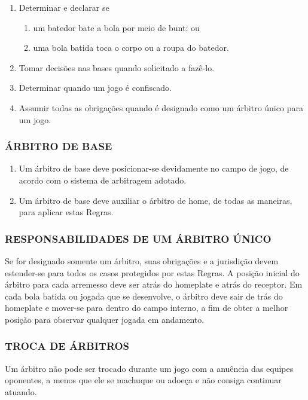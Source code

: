 \begin{multicols}{2}
\begin{enumerate}[label=\alph*)]
		\item  Determinar e declarar se 
		\begin{enumerate}[label=\roman* -]
			\item um batedor bate a bola por meio de \gls{bunt}; ou 
			\item uma bola batida toca o corpo ou a roupa do batedor. 
		\end{enumerate}
		
		\item  Tomar decis\~oes nas bases quando solicitado a faz\^e-lo. 
		
		\item  Determinar quando um jogo \'e confiscado. 
		
		\item  Assumir todas as obriga\c{c}\~oes quando \'e designado como um \'arbitro \'unico para um jogo. 
	\end{enumerate}
	
	
	\subsubsection{\'ARBITRO DE BASE} 
	
	\begin{enumerate}[label=\alph*)]
		\item Um \'arbitro de base deve posicionar-se devidamente no campo de jogo, de acordo com o sistema de arbitragem adotado. 
		
		\item  Um \'arbitro de base deve auxiliar o \'arbitro de \gls{home}, de todas as maneiras, para aplicar estas Regras. 
	\end{enumerate}
	
	\subsubsection{RESPONSABILIDADES DE UM \'ARBITRO ÚNICO }
	Se for designado somente um \'arbitro, suas obriga\c{c}\~oes e a jurisdi\c{c}\~ao devem estender-se para todos os casos protegidos por estas Regras. A posi\c{c}\~ao inicial do \'arbitro para cada arremesso deve ser atr\'as do \gls{homeplate} e atr\'as do receptor. Em cada bola batida ou jogada que se desenvolve, o \'arbitro deve sair de tr\'as do \gls{homeplate} e mover-se para dentro do campo interno, a fim de obter a melhor posi\c{c}\~ao para observar qualquer jogada em andamento. 
	\subsubsection{TROCA DE \'ARBITROS }
	Um \'arbitro n\~ao pode ser trocado durante um jogo com a anu\^encia das equipes oponentes, a menos que ele se machuque ou adoe\c{c}a e n\~ao consiga continuar atuando. 
	

\end{multicols}
